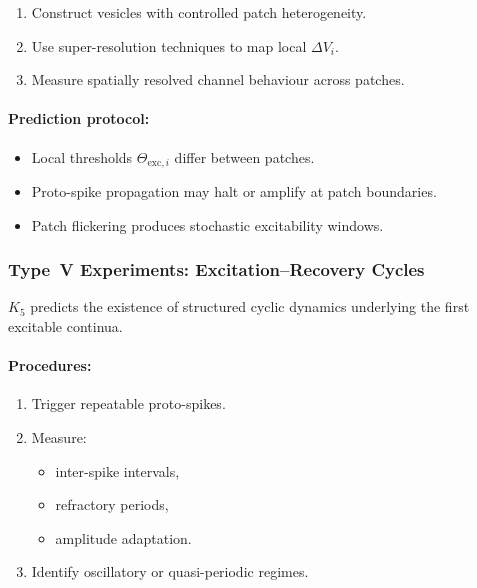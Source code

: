 \begin{enumerate}
    \item Construct vesicles with controlled patch heterogeneity.
    \item Use super-resolution techniques to map local $\Delta V_i$.
    \item Measure spatially resolved channel behaviour across patches.
\end{enumerate}

\paragraph{Prediction protocol:}

\begin{itemize}
    \item Local thresholds $\Theta_{\mathrm{exc},i}$ differ between patches.
    \item Proto-spike propagation may halt or amplify at patch boundaries.
    \item Patch flickering produces stochastic excitability windows.
\end{itemize}



\subsubsection{Type~V Experiments: Excitation--Recovery Cycles}

$K_5$ predicts the existence of structured cyclic dynamics
underlying the first excitable continua.

\paragraph{Procedures:}

\begin{enumerate}
    \item Trigger repeatable proto-spikes.
    \item Measure:
          \begin{itemize}
              \item inter-spike intervals,
              \item refractory periods,
              \item amplitude adaptation.
          \end{itemize}
    \item Identify oscillatory or quasi-periodic regimes.
\end{enumerate}

